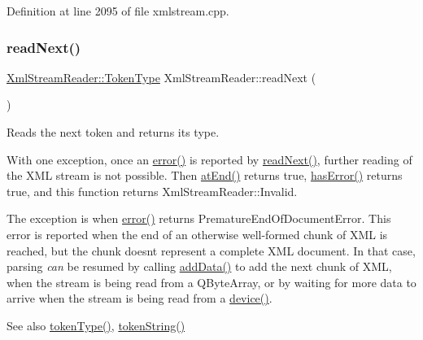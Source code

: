Definition at line 2095 of file xmlstream.\+cpp.

\mbox{\label{class_xml_stream_reader_adb18e6f9842e9b470cde16385732ad84}} 
\subsubsection{\texorpdfstring{read\+Next()}{readNext()}}
{\footnotesize\ttfamily \hyperlink{class_xml_stream_reader_a99e2023f874f0ca648c996ae79c3b5f7}{Xml\+Stream\+Reader\+::\+Token\+Type} Xml\+Stream\+Reader\+::read\+Next (\begin{DoxyParamCaption}{ }\end{DoxyParamCaption})}

Reads the next token and returns its type.

With one exception, once an \hyperlink{class_xml_stream_reader_ae9a7e8fe9f15b0f5c4ec5fa080c6249f}{error()} is reported by \hyperlink{class_xml_stream_reader_adb18e6f9842e9b470cde16385732ad84}{read\+Next()}, further reading of the X\+ML stream is not possible. Then \hyperlink{class_xml_stream_reader_a4acf0ba0ea25300b66c9d85ba3e8dfb3}{at\+End()} returns {\ttfamily true}, \hyperlink{class_xml_stream_reader_a26bc2d6831322e5a1d86182295f912d0}{has\+Error()} returns {\ttfamily true}, and this function returns Xml\+Stream\+Reader\+::\+Invalid.

The exception is when \hyperlink{class_xml_stream_reader_ae9a7e8fe9f15b0f5c4ec5fa080c6249f}{error()} returns Premature\+End\+Of\+Document\+Error. This error is reported when the end of an otherwise well-\/formed chunk of X\+ML is reached, but the chunk doesn\textquotesingle{}t represent a complete X\+ML document. In that case, parsing {\itshape can} be resumed by calling \hyperlink{class_xml_stream_reader_add6baa0f8790fc528c1fa6e05755f96b}{add\+Data()} to add the next chunk of X\+ML, when the stream is being read from a Q\+Byte\+Array, or by waiting for more data to arrive when the stream is being read from a \hyperlink{class_xml_stream_reader_aa2a751d1b36fac13138b2f370683dfe7}{device()}.

\begin{DoxySeeAlso}{See also}
\hyperlink{class_xml_stream_reader_a2c26bfb63c27f2992e24f038d65c8c0a}{token\+Type()}, \hyperlink{class_xml_stream_reader_a7e60a09f7692db1fccc420573b56c68b}{token\+String()} 
\end{DoxySeeAlso}


